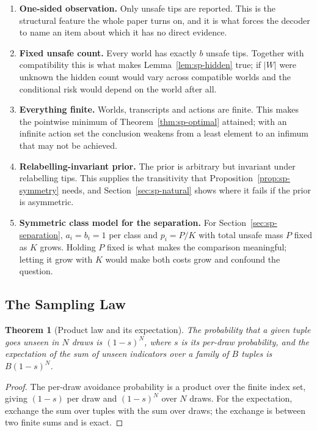 \documentclass[conference]{IEEEtran}
\newtheorem{theorem}{Theorem}
\theoremstyle{definition}
\begin{document}
\begin{enumerate}
\item[1)] \textbf{One-sided observation.} Only unsafe tips are reported. This is the
structural feature the whole paper turns on, and it is what forces the decoder to name an item
about which it has no direct evidence.

\item[2)] \textbf{Fixed unsafe count.} Every world has exactly $b$ unsafe tips. Together with
compatibility this is what makes Lemma~\ref{lem:sp-hidden} true; if $|W|$ were unknown the hidden
count would vary across compatible worlds and the conditional risk would depend on the world
after all.

\item[3)] \textbf{Everything finite.} Worlds, transcripts and actions are finite. This makes
the pointwise minimum of Theorem~\ref{thm:sp-optimal} attained; with an infinite action set the
conclusion weakens from a least element to an infimum that may not be achieved.

\item[4)] \textbf{Relabelling-invariant prior.} The prior is arbitrary but invariant under
relabelling tips. This supplies the transitivity that Proposition~\ref{prop:sp-symmetry} needs,
and Section~\ref{sec:sp-natural} shows where it fails if the prior is asymmetric.

\item[5)] \textbf{Symmetric class model for the separation.} For
Section~\ref{sec:sp-separation}, $a_{i}=b_{i}=1$ per class and $p_{i}=P/K$ with total unsafe mass
$P$ fixed as $K$ grows. Holding $P$ fixed is what makes the comparison meaningful; letting it
grow with $K$ would make both costs grow and confound the question.
\end{enumerate}

\subsection{The Sampling Law}
\label{sec:sp-sampling}

\begin{theorem}[Product law and its expectation]
\label{thm:sp-sampling}
The probability that a given tuple goes unseen in $N$ draws is $(1-s)^{N}$, where $s$ is its
per-draw probability, and the expectation of the sum of unseen indicators over a family of $B$
tuples is $B(1-s)^{N}$.
\end{theorem}

\begin{proof}
The per-draw avoidance probability is a product over the finite index set, giving $(1-s)$ per
draw and $(1-s)^{N}$ over $N$ draws. For the expectation, exchange the sum over tuples with
the sum over draws; the exchange is between two finite sums and is exact.
\end{proof}
\end{document}
